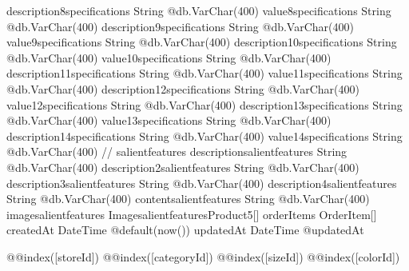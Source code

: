 {  description8specifications   String                         @db.VarChar(400)
  value8specifications         String                         @db.VarChar(400)
  description9specifications   String                         @db.VarChar(400)
  value9specifications         String                         @db.VarChar(400)
  description10specifications  String                         @db.VarChar(400)
  value10specifications        String                         @db.VarChar(400)
  description11specifications  String                         @db.VarChar(400)
  value11specifications        String                         @db.VarChar(400)
  description12specifications  String                         @db.VarChar(400)
  value12specifications        String                         @db.VarChar(400)
  description13specifications  String                         @db.VarChar(400)
  value13specifications        String                         @db.VarChar(400)
  description14specifications  String                         @db.VarChar(400)
  value14specifications        String                         @db.VarChar(400)
  // salientfeatures
  descriptionsalientfeatures   String                         @db.VarChar(400)
  description2salientfeatures  String                         @db.VarChar(400)
  description3salientfeatures  String                         @db.VarChar(400)
  description4salientfeatures  String                         @db.VarChar(400)
  contentsalientfeatures       String                         @db.VarChar(400)
  imagesalientfeatures ImagesalientfeaturesProduct5[]
  orderItems                   OrderItem[]
  createdAt                    DateTime                       @default(now())
  updatedAt                    DateTime                       @updatedAt

  @@index([storeId])
  @@index([categoryId])
  @@index([sizeId])
  @@index([colorId])
}


